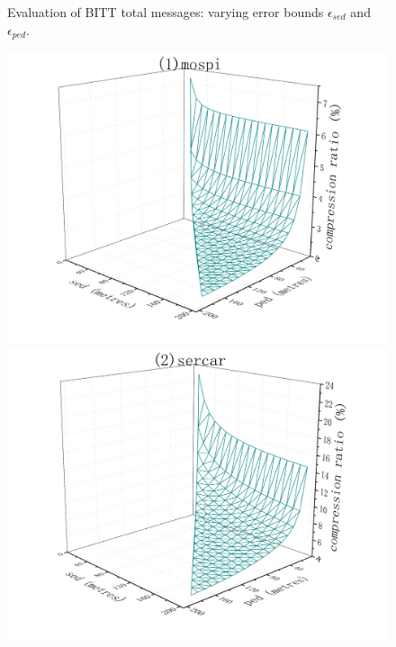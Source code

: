 {\begin{figure}[tb!]
	\caption{\small Evaluation of BITT total messages: varying error bounds $\epsilon_{sed}$ and $\epsilon_{ped}$.}
	\label{fig:bitt-total-message}
\end{figure}




\begin{figure}[tb!]
	\centering
	\includegraphics[scale = 0.210]{figures/Fig-BITT-mopsi-compression-ratio.png}\hspace{1ex}
	\includegraphics[scale = 0.210]{figures/Fig-BITT-sercar-compression-ratio.png}\hspace{1ex}

\end{figure}}
